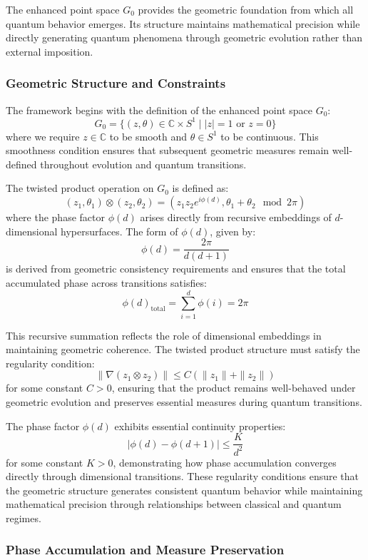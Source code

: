 \documentclass[10pt]{article}
\begin{document}
The enhanced point space $G_0$ provides the geometric foundation from which all quantum behavior emerges. Its structure maintains mathematical precision while directly generating quantum phenomena through geometric evolution rather than external imposition.

\subsubsection{Geometric Structure and Constraints}

The framework begins with the definition of the enhanced point space $G_0$:
\[
G_0 = \{(z, \theta) \in \mathbb{C} \times S^1 \mid |z| = 1 \text{ or } z = 0\}
\]
where we require $z \in \mathbb{C}$ to be smooth and $\theta \in S^1$ to be continuous. This smoothness condition ensures that subsequent geometric measures remain well-defined throughout evolution and quantum transitions.

The twisted product operation on $G_0$ is defined as:
\[
(z_1, \theta_1) \otimes (z_2, \theta_2) = \left(z_1 z_2 e^{i\phi(d)}, \theta_1 + \theta_2 \mod 2\pi\right)
\]
where the phase factor $\phi(d)$ arises directly from recursive embeddings of $d$-dimensional hypersurfaces. The form of $\phi(d)$, given by:
\[
\phi(d) = \frac{2\pi}{d(d+1)}
\]
is derived from geometric consistency requirements and ensures that the total accumulated phase across transitions satisfies:
\[
\phi(d)_{\text{total}} = \sum_{i=1}^d \phi(i) = 2\pi
\]

This recursive summation reflects the role of dimensional embeddings in maintaining geometric coherence. The twisted product structure must satisfy the regularity condition:
\[
\|\nabla(z_1 \otimes z_2)\| \leq C(\|z_1\| + \|z_2\|)
\]
for some constant $C > 0$, ensuring that the product remains well-behaved under geometric evolution and preserves essential measures during quantum transitions.

The phase factor $\phi(d)$ exhibits essential continuity properties:
\[
|\phi(d) - \phi(d+1)| \leq \frac{K}{d^2}
\]
for some constant $K > 0$, demonstrating how phase accumulation converges directly through dimensional transitions. These regularity conditions ensure that the geometric structure generates consistent quantum behavior while maintaining mathematical precision through relationships between classical and quantum regimes.

\subsubsection{Phase Accumulation and Measure Preservation}
\end{document}
